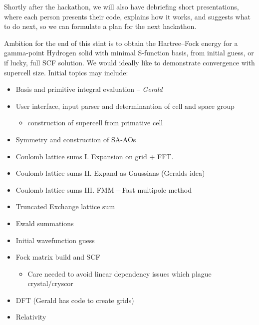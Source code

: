 \documentclass{report}
\begin{document}
Shortly after the hackathon, we will also have debriefing short presentations, where each person presents 
their code, explains how it works, and suggests what to do next, so we can formulate a plan for the next hackathon.

\newpage

Ambition for the end of this stint is to obtain the Hartree--Fock energy for a gamma-point Hydrogen solid with minimal S-function basis, from initial guess, or if lucky, full SCF solution. 
We would ideally like to demonstrate convergence with supercell size. Initial topics may include:

\begin{itemize}
\item Basis and primitive integral evaluation -- {\em Gerald}

\item User interface, input parser and determinantion of cell and space group
\begin{itemize}
\item construction of supercell from primative cell
\end{itemize}

\item Symmetry and construction of SA-AOs

\item Coulomb lattice sums I. Expansion on grid + FFT.

\item Coulomb lattice sums II. Expand as Gaussians (Geralds idea)

\item Coulomb lattice sums III. FMM -- Fast multipole method

\item Truncated Exchange lattice sum

\item Ewald summations

\item Initial wavefunction guess

\item Fock matrix build and SCF
\begin{itemize}
\item Care needed to avoid linear dependency issues which plague crystal/cryscor
\end{itemize}

\item DFT (Gerald has code to create grids)

\item Relativity

\end{itemize}
\end{document}
